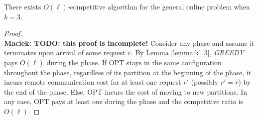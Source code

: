 \documentclass[manuscript,screen=true]{acmart}
\newcommand\maciek[1]{\color{brown}\textbf{\\ Maciek: #1}\color{black}}
\begin{document}
\begin{appendix}
  \begin{theorem} \label{cor:k=3}
    There exists $O(\ell)$-competitive algorithm for the general online problem when $k=3$. 
  \end{theorem}
  \begin{proof}
    \maciek{TODO: this proof is incomplete!}
    Consider any phase and assume it terminates upon arrival of some request $r$.
    By Lemma  \ref{lemma:k=3},
    \emph{GREEDY} pays $O(\ell)$ during the phase.
    If OPT stays in the same configuration throughout the phase,
    regardless of its partition at the beginning of the phase,        
    it incurs remote communication cost for at least one request $r'$ (possibly $r'=r$) by the end of the phase.
    Else,
    OPT incurs the cost of moving to new partitions.
    In any case,
    OPT pays at least one during the phase and 
    the competitive ratio is $O(\ell)$.
  \end{proof}
  
  

\end{appendix}
\end{document}
